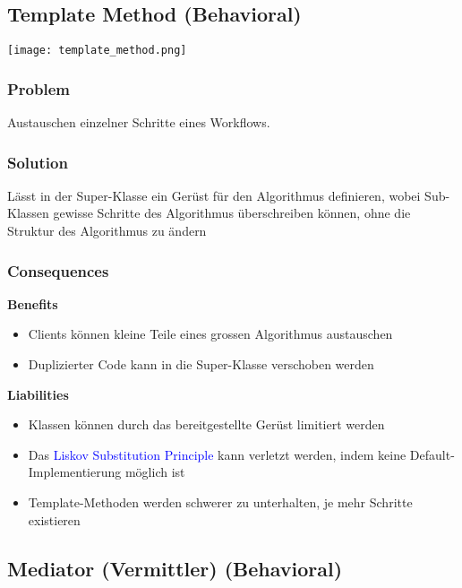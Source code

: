 \subsection{Template Method (Behavioral)}

\texttt{[image: template\_method.png]}

\subsubsection{Problem}

Austauschen einzelner Schritte eines Workflows.

\subsubsection{Solution}

Lässt in der Super-Klasse ein Gerüst für den Algorithmus definieren, wobei Sub-Klassen gewisse Schritte des Algorithmus überschreiben können, ohne die Struktur des Algorithmus zu ändern

\subsubsection{Consequences}

\textbf{Benefits}
\begin{itemize}
    \item Clients können kleine Teile eines grossen Algorithmus austauschen
    \item Duplizierter Code kann in die Super-Klasse verschoben werden
\end{itemize}
\vspace{10pt}
\textbf{Liabilities}

\begin{itemize}
    \item Klassen können durch das bereitgestellte Gerüst limitiert werden
    \item Das \textcolor{blue}{Liskov Substitution Principle} kann verletzt werden, indem keine Default-Implementierung möglich ist
    \item Template-Methoden werden schwerer zu unterhalten, je mehr Schritte existieren
\end{itemize}

\subsection{Mediator (Vermittler) (Behavioral)}

